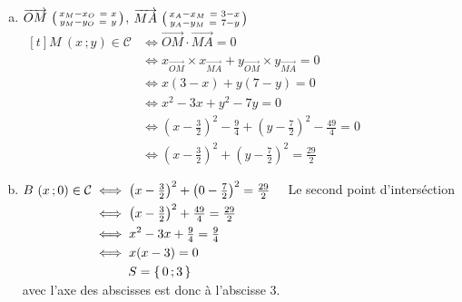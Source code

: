\documentclass[12pt, a4paper]{article}
\begin{document}
    \pagebreak

    \begin{Exercise}[number={72}]
        \begin{enumerate}[a)]
            \item	$\overrightarrow{OM}\ \begin{psmallmatrix}x_M-x_O\ =& x \\ y_M-y_O\ =& y\end{psmallmatrix}$, \quad $\overrightarrow{MA}\ \begin{psmallmatrix}x_A-x_M\ =& 3-x \\ y_A-y_M\ =& 7-y\end{psmallmatrix}$ \smallbreak $\begin{aligned}[t]
                        M\ (x\,;y)\in\mathcal{C}&\iff\overrightarrow{OM}\cdot\overrightarrow{MA}=0 &\\
                        &\iff x_{\overrightarrow{OM}}\times x_{\overrightarrow{MA}}+y_{\overrightarrow{OM}}\times y_{\overrightarrow{MA}}=0 &\\
                        &\iff x(3-x)+y(7-y)=0 &\\
                        &\iff x^2-3x+y^2-7y=0 &\\
                        &\iff \left(x-\tfrac{3}{2}\right)^2-\tfrac{9}{4}+\left(y-\tfrac{7}{2}\right)^2-\tfrac{49}{4}=0 &\\
                        &\iff \left(x-\tfrac{3}{2}\right)^2+\left(y-\tfrac{7}{2}\right)^2=\tfrac{29}{2}
                    \end{aligned}$ \medbreak
            \item 	$\begin{aligned}[t]
                        B\ (x\,;0)\in\mathcal{C}&\iff\left(x-\tfrac{3}{2}\right)^2+\left(0-\tfrac{7}{2}\right)^2=\tfrac{29}{2} &\\
                        &\iff \left(x-\tfrac{3}{2}\right)^2+\tfrac{49}{4}=\tfrac{29}{2} &\\
                        &\iff x^2-3x+\tfrac{9}{4}=\tfrac{9}{4} &\\
                        &\iff x(x-3)=0 &\\
                        &\hphantom{\iff}\ \, S=\left\{\,0\,;3\,\right\}
                    \end{aligned}$ \smallbreak Le second point d'interséction avec l'axe des abscisses est donc à l'abscisse 3.
        \end{enumerate}
    \end{Exercise}
\end{document}
